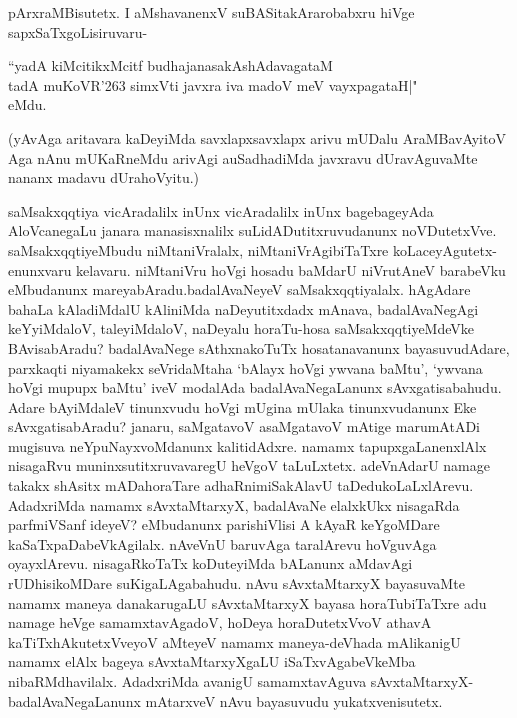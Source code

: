 pArxraMBisutetx. I aMshavanenxV suBASitakArarobabxru hiVge sapxSaTxgoLisiruvaru-

\medskip
 
 \begin{shloka}
 ``yadA kiMcitikxMcitf budhajanasakAshAdavagataM \\
 tadA muKoVR\char'263 simxVti javxra iva madoV meV vayxpagataH|"\\
 eMdu.
 \end{shloka}

\newpage

 \noindent
(yAvAga aritavara kaDeyiMda savxlapxsavxlapx arivu mUDalu AraMBavAyitoV Aga nAnu mUKaR\-neMdu arivAgi auSadhadiMda javxravu dUravAguvaMte nananx madavu dUrahoVyitu.)

saMsakxqqtiya vicAradalilx inUnx vicAradalilx inUnx bagebageyAda AloVcane\-gaLu janara manasisx\-nalilx suLidADutitxruvudanunx noVDutetxVve. saMsakxqqti\-yeMbudu niMtaniVralalx, niMtaniVrAgibiTaTxre koLace\-yAgutetx-\-enunxvaru kelavaru. niMta\-niVru hoVgi hosadu baMdarU niVrutAneV barabeVku eMbu\-danunx mareyabAradu.\break badalAvaNeyeV saMsakxqqtiyalalx. hAgAdare bahaLa kAla\-diMdalU kAliniMda naDe\-yutitxdadx mAnava, badalAvaNegAgi keYyiMdaloV, taleyiMdaloV, naDeyalu horaTu-hosa saMsakxqqtiyeMdeVke BAvisabAradu? badalAvaNege sAthxnakoTuTx hosatanavanunx bayasuvudAdare, parxkaqti niyamakekx seVridaMtaha `bAlayx hoVgi ywvana baMtu', `ywvana hoVgi mupupx baMtu' iveV moda\-lAda badalA\-vaNe\-gaLanunx sAvxgatisabahudu. Adare bAyiMdaleV tinunxvudu hoVgi mUgina\- mUlaka\- tinunx\-vudanunx Eke sAvxgatisabAradu? janaru, saMgatavoV asaMgatavoV mAtige marumAtADi mugisuva neYpuNayxvoMdanunx kalitidAdxre. namamx tapupxgaLanenxlAlx nisagaRvu muninxsutitxruvavaregU heVgoV taLuLxtetx. adeVnAdarU namage takakx shAsitx mADahoraTare adhaRnimiSakAlavU taDedukoLaLxlArevu. AdadxriMda namamx sAvxtaMtarxyX, badalAvaNe elalxkUkx nisagaRda parfmiVSanf ideyeV? eMbu\-danunx pari\-shiVlisi A kAyaR\- keYgoMDare kaSaTxpaDabeVkAgilalx. nAveVnU baruvAga taralArevu hoVguvAga oyayxlArevu. nisagaRkoTaTx koDuteyiMda bALanunx aMdavAgi rUDhisikoMDare suKigaLAgabahudu. nAvu sAvxtaMtarxyX bayasuvaMte namamx maneya danakarugaLU sAvxtaMtarxyX bayasa horaTubiTaTxre adu namage heVge samamxta\-vAgadoV, hoDeya horaDutetxVvoV athavA kaTiTxhAkutetxVveyoV aMteyeV namamx maneya-deVhada mAlikanigU namamx elAlx bageya sAvxtaMtarxyXgaLU iSaTxvAgabeVkeMba \-nibaRMdhavilalx. AdadxriMda avanigU samamxtavAguva sAvxtaMtarxyX-badalAvaNegaLanunx mAtarxveV nAvu bayasuvudu yukatxvenisutetx.

